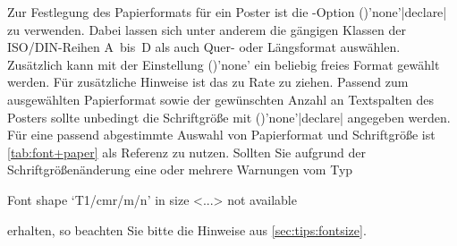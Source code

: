 \begin{Bundle*}[v2.05]{}
Zur Festlegung des Papierformats für ein Poster ist die \KOMAScript-Option 
()'none'|declare| zu verwenden. 
Dabei lassen sich unter anderem die gängigen Klassen der ISO/DIN-Reihen A~bis~D 
als auch Quer- oder Längsformat auswählen. Zusätzlich kann mit der Einstellung
()'none'
ein beliebig freies Format gewählt werden. Für zusätzliche Hinweise ist das 
\scrguide zu Rate zu ziehen. Passend zum ausgewählten Papierformat sowie der 
gewünschten Anzahl an Textspalten des Posters sollte unbedingt die Schriftgröße 
mit ()'none'|declare|
angegeben werden. Für eine passend abgestimmte Auswahl von Papierformat und 
Schriftgröße ist \autoref{tab:font+paper} als Referenz zu nutzen. Sollten Sie 
aufgrund der Schriftgrößenänderung eine oder mehrere Warnungen vom Typ
%
\begin{quoting}
\begin{Code}
Font shape `T1/cmr/m/n' in size <...> not available
\end{Code}
\end{quoting}
%
erhalten, so beachten Sie bitte die Hinweise aus \autoref{sec:tips:fontsize}.



\end{Bundle*}
